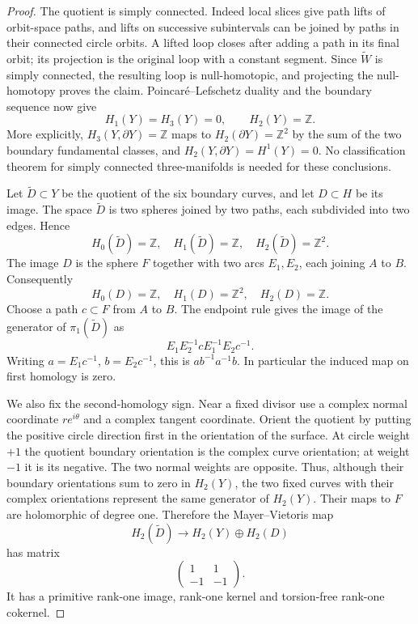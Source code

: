 \begin{proof}
The quotient is simply connected. Indeed local slices give path
lifts of orbit-space paths, and lifts on successive subintervals
can be joined by paths in their connected circle orbits. A lifted
loop closes after adding a path in its final orbit; its projection
is the original loop with a constant segment. Since
\(\widetilde W\) is simply connected, the resulting loop is
null-homotopic, and projecting the null-homotopy proves the claim.
Poincar\'e--Lefschetz duality and the boundary sequence now give
\[
 H_1(Y)=H_3(Y)=0,\qquad H_2(Y)=\mathbb Z.
\]
More explicitly, \(H_3(Y,\partial Y)=\mathbb Z\) maps to
\(H_2(\partial Y)=\mathbb Z^2\) by the sum of the two boundary
fundamental classes, and \(H_2(Y,\partial Y)=H^1(Y)=0\).
No classification theorem for simply connected three-manifolds
is needed for these conclusions.

Let \(\widetilde D\subset Y\) be the quotient of the six
boundary curves, and let \(D\subset H\) be its image. The space
\(\widetilde D\) is two spheres joined by two paths, each
subdivided into two edges. Hence
\[
 H_0(\widetilde D)=\mathbb Z,\quad
 H_1(\widetilde D)=\mathbb Z,\quad
 H_2(\widetilde D)=\mathbb Z^2.
\]
The image \(D\) is the sphere \(F\) together with two arcs
\(E_1,E_2\), each joining \(A\) to \(B\). Consequently
\[
 H_0(D)=\mathbb Z,\quad H_1(D)=\mathbb Z^2,\quad
 H_2(D)=\mathbb Z.
\]
Choose a path \(c\subset F\) from \(A\) to \(B\). The
endpoint rule gives the image of the generator of
\(\pi_1(\widetilde D)\) as
\[
 E_1E_2^{-1}cE_1^{-1}E_2c^{-1}.
\]
Writing \(a=E_1c^{-1}\), \(b=E_2c^{-1}\), this is
\(ab^{-1}a^{-1}b\). In particular the induced map on first
homology is zero.

We also fix the second-homology sign. Near a fixed divisor use a
complex normal coordinate \(re^{i\theta}\) and a complex tangent
coordinate. Orient the quotient by putting the positive circle
direction first in the orientation of the surface. At circle
weight \(+1\) the quotient boundary orientation is the complex
curve orientation; at weight \(-1\) it is its negative. The
two normal weights are opposite. Thus, although their boundary
orientations sum to zero in \(H_2(Y)\), the two fixed curves
with their complex orientations represent the same generator
of \(H_2(Y)\). Their maps to \(F\) are holomorphic of degree
one. Therefore the Mayer--Vietoris map
\[
 H_2(\widetilde D)\longrightarrow H_2(Y)\oplus H_2(D)
\]
has matrix
\[
 \begin{pmatrix}1&1\\-1&-1\end{pmatrix}.
\]
It has a primitive rank-one image, rank-one kernel and torsion-free
rank-one cokernel.


\end{proof}
